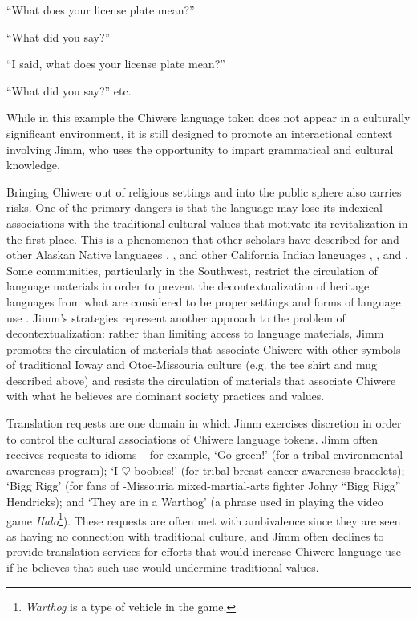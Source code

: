 \documentclass[output=paper]{LSP/langsci}
\begin{document}
	``What does your license plate mean?''
	
	``What did you say?''
	
	``I said, what does your license plate mean?''
	
	``What did you say?'' etc.
	
While in this example the Chiwere language token does not appear in a culturally significant environment, it is still designed to promote an interactional context involving Jimm, who uses the opportunity to impart grammatical and cultural knowledge.

Bringing Chiwere out of religious settings and into the public sphere also carries risks. One of the primary dangers is that the language may lose its indexical associations with the traditional cultural values that motivate its revitalization in the first place. This is a phenomenon that other scholars have described for  and other Alaskan Native languages \citep{DauenhauerDauenhauer1998},  \citep{Nevins2013, Samuels2006},  and other California Indian languages \citep{Ahlers2006},  \citep{Meek2010}, and  \citep{Perley2011}. Some communities, particularly in the Southwest, restrict the circulation of language materials in order to prevent the decontextualization of heritage languages from what are considered to be proper settings and forms of language use \citep{Debenport2015, Whiteley2003}. Jimm's  strategies represent another approach to the problem of decontextualization: rather than limiting access to language materials, Jimm promotes the circulation of materials that associate Chiwere with other symbols of traditional Ioway and Otoe-Missouria culture (e.g. the tee shirt and mug described above) and resists the circulation of materials that associate Chiwere with what he believes are dominant society practices and values.

Translation requests are one domain in which Jimm exercises discretion in order to control the cultural associations of Chiwere language tokens. Jimm often receives requests to   idioms -- for example, `Go green!' (for a tribal environmental awareness program); `I $\heartsuit$ boobies!' (for tribal breast-cancer awareness bracelets); `Bigg Rigg' (for fans of -Missouria mixed-martial-arts fighter Johny ``Bigg Rigg'' Hendricks); and `They are in a Warthog' (a phrase used in playing the video game \emph{Halo}\footnote{\emph{Warthog} is a type of vehicle in the game.}). These requests are often met with ambivalence since they are seen as having no connection with traditional culture, and Jimm often declines to provide translation services for efforts that would increase Chiwere language use if he believes that such use would undermine traditional values.
\end{document}
